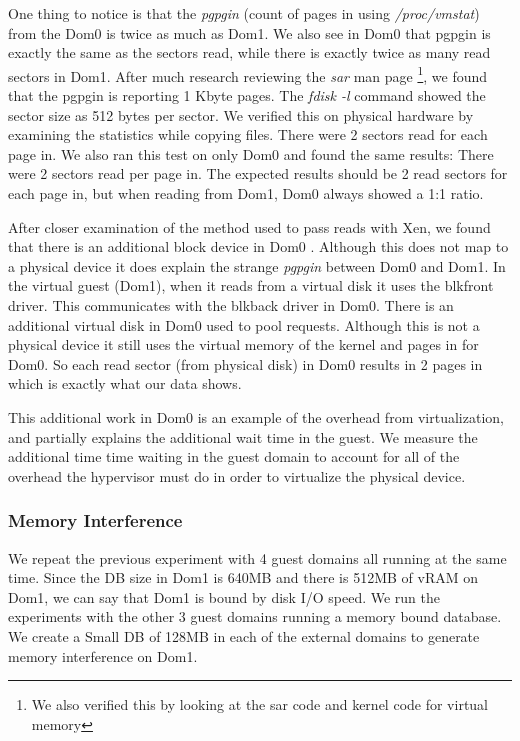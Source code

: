 One thing to notice is that the \emph{pgpgin} (count of pages in using \emph{/proc/vmstat}) from the Dom0 is twice as much as Dom1.  We also see in Dom0 that pgpgin is exactly the same as the sectors read, while there is exactly twice as many read sectors in Dom1.
After much research reviewing the \emph{sar} man page \footnote{We also verified this by looking at the sar code and kernel code for virtual memory}, we found that the pgpgin is reporting 1 Kbyte pages.  The \emph{fdisk -l} command showed the sector size as 512 bytes per sector.  We verified this on physical hardware by examining the statistics while copying files.  There were 2 sectors read for each page in.  We also ran this test on only Dom0 and found the same results:  There were 2 sectors read per page in.  The expected results should be 2 read sectors for each page in, but when reading from Dom1, Dom0 always showed a 1:1 ratio.

After closer examination of the method used to pass reads with Xen, we found that there is an additional block device in Dom0 \cite{citrix}.  Although this does not map to a physical device it does explain the strange \emph{pgpgin} between Dom0 and Dom1.  In the virtual guest (Dom1), when it reads from a virtual disk it uses the blkfront driver.  This communicates with the blkback driver in Dom0.  There is an additional virtual disk in Dom0 used to pool requests.  Although this is not a physical device it still uses the virtual memory of the kernel and pages in for Dom0.  So each read sector (from physical disk) in Dom0 results in 2 pages in which is exactly what our data shows.

This additional work in Dom0 is an example of the overhead from virtualization, and partially explains the additional wait time in the guest.  We measure the additional time time waiting in the guest domain to account for all of the overhead the hypervisor must do in order to virtualize the physical device.

\subsubsection{Memory Interference}
We repeat the previous experiment with 4 guest domains all running at the same time.  Since the DB size in Dom1 is 640MB and there is 512MB of vRAM on Dom1, we can say that Dom1 is bound by disk I/O speed.  We run the experiments with the other 3 guest domains running a memory bound database.  We create a Small DB of 128MB in each of the external domains to generate memory interference on Dom1.

